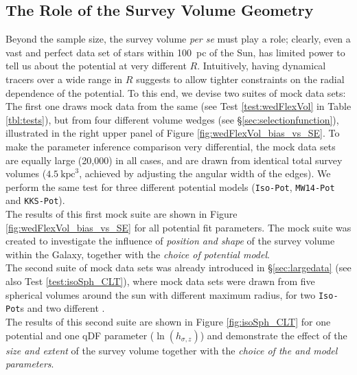 \subsection{The Role of the Survey Volume Geometry} \label{sec:results_obsvolume}

Beyond the sample size, the survey volume {\it per se} must play a role; clearly, even a vast and perfect data set of stars within 100~pc of the Sun, has limited power to tell us about the potential at very different $R$. Intuitively, having dynamical tracers over a wide range in $R$ suggests to allow tighter constraints on the radial dependence of the potential. To this end, we devise two suites of mock data sets: 
\\The first one draws mock data from the same \pmodel (see Test \ref{test:wedFlexVol} in Table \ref{tbl:tests}), but from four different volume wedges (see \S\ref{sec:selectionfunction}), illustrated in the right upper panel of Figure \ref{fig:wedFlexVol_bias_vs_SE}. To make the parameter inference comparison very differential, the mock data sets are equally large (20,000) in all cases, and are drawn from identical total survey volumes ($4.5~\text{kpc}^3$, achieved by adjusting the angular width of the edges). We perform the same test for three different potential models (\texttt{Iso-Pot}, \texttt{MW14-Pot} and \texttt{KKS-Pot}).
\\The results of this first mock suite are shown in Figure \ref{fig:wedFlexVol_bias_vs_SE} for all potential fit parameters. The mock suite was created to investigate the influence of \emph{position and shape} of the survey volume within the Galaxy, together with the \emph{choice of potential model}. 
\\The second suite of mock data sets was already introduced in \S\ref{sec:largedata} (see also Test \ref{test:isoSph_CLT}), where mock data sets were drawn from five spherical volumes around the sun with different maximum radius, for two \texttt{Iso-Pot}s and two different \MAPs{}.
\\The results of this second suite are shown in Figure \ref{fig:isoSph_CLT} for one potential and one qDF parameter ($\ln(h_{\sigma,z})$) and demonstrate the effect of the \emph{size and extent} of the survey volume together with the \emph{choice of the \MAP{} and model parameters}.

